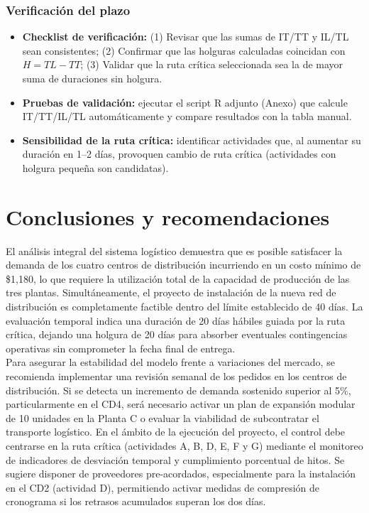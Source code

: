 \documentclass[12pt]{article}
\begin{document}
\subsubsection{Verificación del plazo}
\begin{itemize}
    \item \textbf{Checklist de verificación:} (1) Revisar que las sumas de IT/TT y IL/TL sean consistentes; (2) Confirmar que las holguras calculadas coincidan con $H = TL - TT$; (3) Validar que la ruta crítica seleccionada sea la de mayor suma de duraciones sin holgura.
    \item \textbf{Pruebas de validación:} ejecutar el script R adjunto (Anexo) que calcule IT/TT/IL/TL automáticamente y compare resultados con la tabla manual.
    \item \textbf{Sensibilidad de la ruta crítica:} identificar actividades que, al aumentar su duración en 1--2 días, provoquen cambio de ruta crítica (actividades con holgura pequeña son candidatas).
\end{itemize}

\section{Conclusiones y recomendaciones}

El análisis integral del sistema logístico demuestra que es posible satisfacer la demanda de los cuatro centros de distribución incurriendo en un costo mínimo de \$1,180, lo que requiere la utilización total de la capacidad de producción de las tres plantas. Simultáneamente, el proyecto de instalación de la nueva red de distribución es completamente factible dentro del límite establecido de 40 días. La evaluación temporal indica una duración de 20 días hábiles guiada por la ruta crítica, dejando una holgura de 20 días para absorber eventuales contingencias operativas sin comprometer la fecha final de entrega.\\

Para asegurar la estabilidad del modelo frente a variaciones del mercado, se recomienda implementar una revisión semanal de los pedidos en los centros de distribución. Si se detecta un incremento de demanda sostenido superior al 5\%, particularmente en el CD4, será necesario activar un plan de expansión modular de 10 unidades en la Planta C o evaluar la viabilidad de subcontratar el transporte logístico. En el ámbito de la ejecución del proyecto, el control debe centrarse en la ruta crítica (actividades A, B, D, E, F y G) mediante el monitoreo de indicadores de desviación temporal y cumplimiento porcentual de hitos. Se sugiere disponer de proveedores pre-acordados, especialmente para la instalación en el CD2 (actividad D), permitiendo activar medidas de compresión de cronograma si los retrasos acumulados superan los dos días.\\
\end{document}
